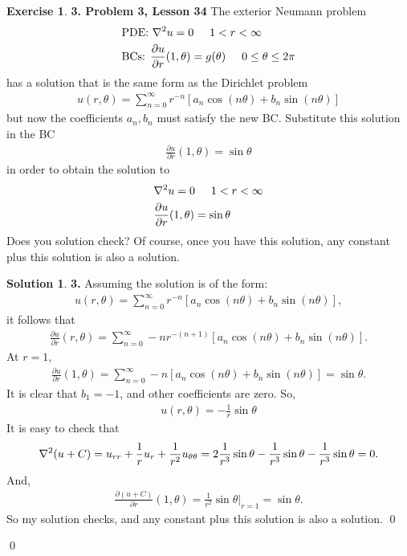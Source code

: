 \documentclass{article}
\theoremstyle{definition}
\newtheorem*{exer*}{Exercise}
\newtheorem*{sln*}{Solution}
\newcommand{\p}{\partial}
\newcommand{\f}[2]{\frac{#1}{#2}}
\newcommand{\lb}{\left[}
\newcommand{\rb}{\right]}
\begin{document}
\begin{exer*}\textbf{3. Problem 3, Lesson 34} 
	The exterior Neumann problem 
	\begin{align*}
	&\text{PDE: } \laplacian u = 0\hspace{0.5cm} 1 < r < \infty\\
	&\text{BCs: } \f{\p u}{\p r}(1,\theta) = g(\theta) \hspace{0.5cm} 0 \leq \theta \leq 2\pi
	\end{align*}
	has a solution that is the same form as the Dirichlet problem 
	\begin{align*}
	u(r,\theta) = \sum^\infty_{n=0} r^{-n}
	\lb a_n\cos(n\theta) + b_n\sin(n\theta) \rb
	\end{align*}
	but now the coefficients $a_n, b_n$ must satisfy the new BC. Substitute this solution in the BC
	\begin{align*}
	\f{\p u}{\p r}(1,\theta) = \sin\theta
	\end{align*}
	in order to obtain the solution to 
	\begin{align*}
	&\laplacian u = 0 \hspace{0.5cm} 1 < r < \infty\\
	&\f{\p u}{\p r}(1,\theta) = \sin\theta
	\end{align*}
	Does you solution check? Of course, once you have this solution, any constant plus this solution is also a solution. 
	
	\begin{sln*}\textbf{3. }
		Assuming the solution is of the form:
		\begin{align*}
		u(r,\theta) = \sum^\infty_{n=0} r^{-n}
		\lb a_n\cos(n\theta) + b_n\sin(n\theta) \rb,
		\end{align*}
		it follows that
		\begin{align*}
		\f{\p u}{\p r}(r,\theta) = \sum^\infty_{n=0} -n r^{-(n+1)}
		\lb a_n\cos(n\theta) + b_n\sin(n\theta) \rb.
		\end{align*}
		At $r=1$,
		\begin{align*}
		\f{\p u}{\p r}(1,\theta) = \sum^\infty_{n=0} -n
		\lb a_n\cos(n\theta) + b_n\sin(n\theta) \rb = \sin \theta.
		\end{align*}
		It is clear that $b_1 = -1$, and other coefficients are zero. So,
		\begin{align*}
		\boxed{u(r,\theta) = -\f{1}{r}\sin\theta}
		\end{align*}
		It is easy to check that
		\begin{align*}
		\laplacian (u+C) = u_{rr} + \f{1}{r}u_r + \f{1}{r^2}u_{\theta\theta} = 2\f{1}{r^3}\sin\theta - \f{1}{r^3}\sin\theta - \f{1}{r^3}\sin\theta = 0.
		\end{align*}
		And,
		\begin{align*}
		\f{\p (u+C)}{\p r}(1,\theta) = \f{1}{r^2}\sin\theta\bigg\vert_{r=1} = \sin\theta.
		\end{align*}
		So my solution checks, and any constant plus this solution is also a solution. \qed
	\end{sln*}\qed
\end{exer*}
\newpage
\end{document}
